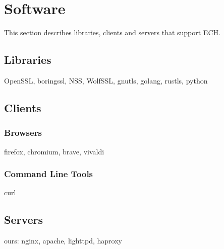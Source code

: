 \section{Software}

This section describes libraries, clients and servers that support ECH.

\subsection{Libraries}

OpenSSL, boringssl, NSS, WolfSSL, gnutls, golang, rustls, python

\subsection{Clients}

\subsubsection{Browsers}

firefox, chromium, brave, vivaldi

\subsubsection{Command Line Tools}

curl

\subsection{Servers}

ours: nginx, apache, lighttpd, haproxy


